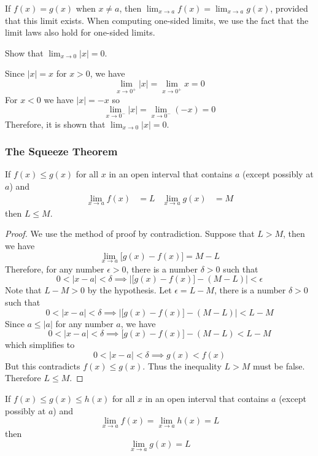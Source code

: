 If \(f(x)=g(x)\) when \(x\neq a\),
then \(\displaystyle{\lim_{x\to a}f(x)=\lim_{x\to a}g(x)}\),
provided that this limit exists.
When computing one-sided limits,
we use the fact that the limit laws also hold for one-sided limits.
\begin{problem}
    Show that \(\displaystyle{\lim_{x\to 0}|x|=0}\).
\end{problem}
\begin{solution}
    Since \(|x|=x\) for \(x>0\),
    we have
    \[\lim_{x\to 0^+}|x|=\lim_{x\to 0^+}x=0\]
    For \(x<0\) we have \(|x|=-x\) so
    \[\lim_{x\to 0^-}|x|=\lim_{x\to 0^-}(-x)=0\]
    Therefore,
    it is shown that \(\displaystyle{\lim_{x\to 0}|x|=0}\).
\end{solution}

\subsubsection*{The Squeeze Theorem}
\begin{theorem}
    If \(f(x)\leq g(x)\) for all \(x\) in an open interval that contains
    \(a\) (except possibly at \(a\)) and
    \begin{align*}
        \lim_{x\to a}f(x) &= L & \lim_{x\to a}g(x) &= M
    \end{align*}
    then \(L\leq M\).
\end{theorem}
\begin{proof}
    We use the method of proof by contradiction.
    Suppose  that \(L>M\),
    then we have
    \[\lim_{x\to a}\bigl[g(x)-f(x)\bigr]=M-L\]
    Therefore,
    for any number \(\epsilon>0\),
    there is a number \(\delta>0\) such that
    \[0<|x-a|<\delta\implies
    \left|\bigl[g(x)-f(x)\bigr]-(M-L)\right|<\epsilon\]
    Note that \(L-M>0\) by the hypothesis.
    Let \(\epsilon=L-M\),
    there is a number \(\delta>0\) such that
    \[0<|x-a|<\delta\implies\left|\bigl[g(x)-f(x)\bigr]-(M-L)\right|<L-M\]
    Since \(a\leq|a|\) for any number \(a\),
    we have
    \[0<|x-a|<\delta\implies \bigl[g(x)-f(x)\bigr]-(M-L)<L-M\]
    which simplifies to
    \[0<|x-a|<\delta\implies g(x)<f(x)\]
    But this contradicts \(f(x)\leq g(x)\).
    Thus the inequality \(L>M\) must be false.
    Therefore \(L\leq M\).
\end{proof}
\begin{theorem}
    If \(f(x)\leq g(x)\leq h(x)\) for all \(x\) in an open interval that
    contains \(a\) (except possibly at \(a\)) and
    \[\lim_{x\to a}f(x)=\lim_{x\to a}h(x)=L\]
    then
    \[\lim_{x\to a}g(x)=L\]
\end{theorem}
